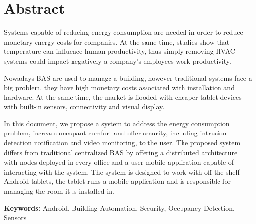 \chapter*{Abstract}


Systems capable of reducing energy consumption are needed in order to reduce monetary energy costs for companies. At the same time, studies show that temperature can influence human productivity, thus simply removing \ac{HVAC} systems could impact negatively a company's employees work productivity.

Nowadays \ac{BAS} are used to manage a building, however traditional systems face a big problem, they have high monetary costs associated with installation and hardware. At the same time, the market is flooded with cheaper tablet devices with built-in sensors, connectivity and visual display.

In this document, we propose a system to address the energy consumption problem, increase occupant comfort and offer security, including intrusion detection notification and video monitoring, to the user. The proposed system differs from traditional centralized \ac{BAS} by offering a distributed architecture with nodes deployed in every office and a user mobile application capable of interacting with the system. 
The system is designed to work with off the shelf Android tablets, the tablet runs a mobile application and is responsible for managing the room it is installed in. 
\vspace{1cm}

\textbf{\Large Keywords:} Android, Building Automation, Security, Occupancy Detection, Sensors

\cleardoublepage
